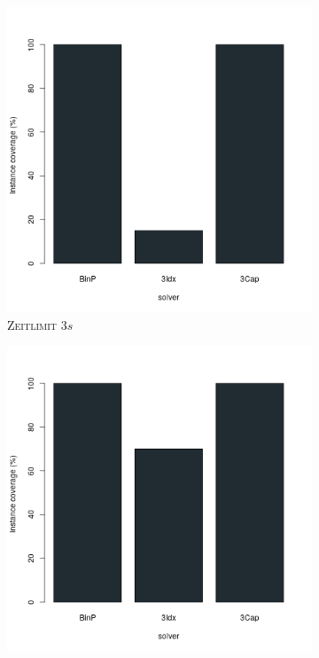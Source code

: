 \begin{figure}[H]
\centering

\begin{subfigure}[b]{0.3\textwidth}
\centering
\includegraphics[width=1.2\textwidth]{img/solver_instance_coverage_b=3_s_3s.png}
\caption{\textsc{Zeitlimit} $3s$}
\label{}
\end{subfigure}
\hfill
\begin{subfigure}[b]{0.3\textwidth}
\centering
\includegraphics[width=1.2\textwidth]{img/solver_instance_coverage_b=3_s_5s.png}

\end{subfigure}
\end{figure}
